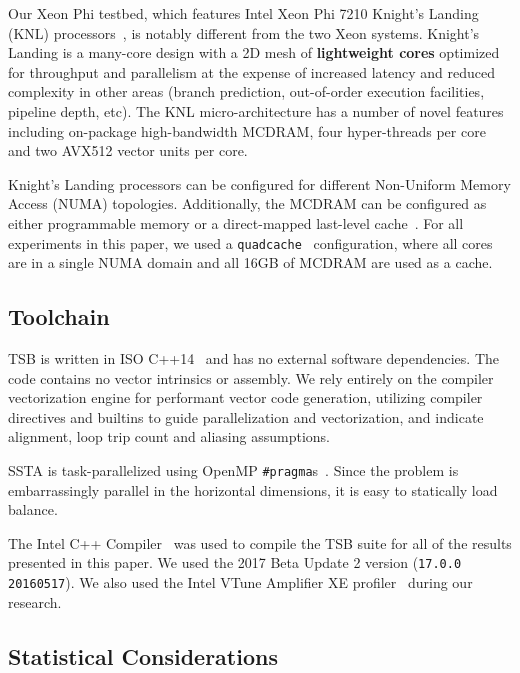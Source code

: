 \documentclass[10pt, conference, compsocconf]{IEEEtran}
\begin{document}
Our Xeon Phi testbed, which features Intel Xeon Phi 7210 Knight's Landing
  (KNL) processors~\cite{intel_ark_xeon_phi_7210}, is notably different from
  the two Xeon systems.
Knight's Landing is a many-core design with a 2D mesh of
  \textbf{lightweight cores} optimized for throughput and parallelism
  at the expense of increased latency and reduced complexity in other areas
  (branch prediction, out-of-order execution facilities, pipeline depth, etc).
The KNL micro-architecture has a number of novel features including on-package
  high-bandwidth MCDRAM, four hyper-threads per core and two AVX512
  vector units per core.~\cite{roofline_knl,knl_sodani}

Knight's Landing processors can be configured for different Non-Uniform Memory
  Access (NUMA) topologies.
Additionally, the MCDRAM can be configured as either programmable memory or a
  direct-mapped last-level cache~\cite{knl_sodani}.
For all experiments in this paper, we used a
  \lstinline{quadcache}~\cite{roofline_knl} configuration, where all cores 
  are in a single NUMA domain and all 16GB of MCDRAM are used as a cache.

\subsection{Toolchain}
\label{sec:setup:toolchain}

TSB is written in ISO C++14~\cite{cxx14_spec} and has no external software
  dependencies.
The code contains no vector intrinsics or assembly.
We rely entirely on the compiler vectorization engine for performant vector
  code generation, utilizing compiler directives and builtins to guide
  parallelization and vectorization, and indicate alignment, loop trip count and
  aliasing assumptions.

SSTA is task-parallelized using OpenMP \lstinline{#pragma}s~\cite{openmp_spec}.
Since the problem is embarrassingly parallel in the horizontal dimensions, it
  is easy to statically load balance.

The Intel C++ Compiler~\cite{intel_cpp_compiler} was used to compile the TSB
  suite for all of the results presented in this paper.
We used the 2017 Beta Update 2 version (\lstinline{17.0.0 20160517}).
We also used the Intel VTune Amplifier XE profiler~\cite{intel_vtune_amplifier}
  during our research.

\subsection{Statistical Considerations}
\label{sec:setup:stats}
\end{document}
